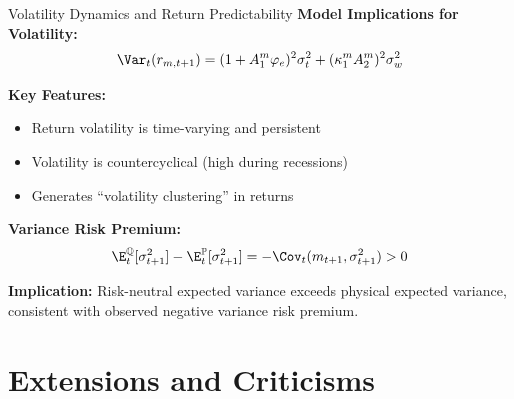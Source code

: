 \documentclass{beamer}
\begin{document}
\begin{frame}{Volatility Dynamics and Return Predictability}
    \textbf{Model Implications for Volatility:}
    \begin{equation}
        \Var_t(r_{m,t+1}) = (1 + A_1^m \varphi_e)^2 \sigma_t^2 + (\kappa_1^m A_2^m)^2 \sigma_w^2
    \end{equation}
    
    \textbf{Key Features:}
    \begin{itemize}
        \item Return volatility is time-varying and persistent
        \item Volatility is countercyclical (high during recessions)
        \item Generates ``volatility clustering'' in returns
    \end{itemize}
    
    \vspace{0.3cm}
    \textbf{Variance Risk Premium:}
    \begin{equation}
        \E_t^{\mathbb{Q}}[\sigma_{t+1}^2] - \E_t^{\mathbb{P}}[\sigma_{t+1}^2] = -\Cov_t(m_{t+1}, \sigma_{t+1}^2) > 0
    \end{equation}
    
    \textbf{Implication:} Risk-neutral expected variance exceeds physical expected variance, consistent with observed negative variance risk premium.
\end{frame}

\section{Extensions and Criticisms}
\end{document}
